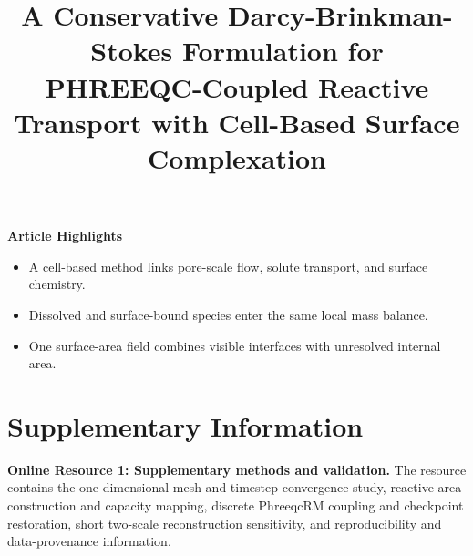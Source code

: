 \documentclass[pdflatex,sn-basic]{sn-jnl}
\begin{document}
\title[Conservative DBS Formulation for PHREEQC-Coupled Reactive Transport]{A Conservative Darcy-Brinkman-Stokes Formulation for PHREEQC-Coupled Reactive Transport with Cell-Based Surface Complexation}

\author*[1,2]{ }

\author[1,2]{ }

\author[1,2]{ }






\maketitle

\noindent\textbf{Article Highlights}
\begin{itemize}
\item A cell-based method links pore-scale flow, solute transport, and surface chemistry.
\item Dissolved and surface-bound species enter the same local mass balance.
\item One surface-area field combines visible interfaces with unresolved internal area.
\end{itemize}









\section*{Supplementary Information}

\textbf{Online Resource 1: Supplementary methods and validation.}
The resource contains the one-dimensional mesh and timestep convergence
study, reactive-area construction and capacity mapping, discrete PhreeqcRM
coupling and checkpoint restoration, short two-scale reconstruction
sensitivity, and reproducibility and data-provenance information.
\end{document}
